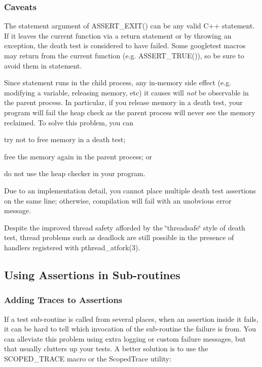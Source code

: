 \subsubsection*{Caveats}

The {\ttfamily statement} argument of {\ttfamily A\+S\+S\+E\+R\+T\+\_\+\+E\+X\+I\+T()} can be any valid C++ statement. If it leaves the current function via a {\ttfamily return} statement or by throwing an exception, the death test is considered to have failed. Some googletest macros may return from the current function (e.\+g. {\ttfamily A\+S\+S\+E\+R\+T\+\_\+\+T\+R\+U\+E()}), so be sure to avoid them in {\ttfamily statement}.

Since {\ttfamily statement} runs in the child process, any in-\/memory side effect (e.\+g. modifying a variable, releasing memory, etc) it causes will {\itshape not} be observable in the parent process. In particular, if you release memory in a death test, your program will fail the heap check as the parent process will never see the memory reclaimed. To solve this problem, you can


\begin{DoxyEnumerate}
\item try not to free memory in a death test;
\item free the memory again in the parent process; or
\item do not use the heap checker in your program.
\end{DoxyEnumerate}

Due to an implementation detail, you cannot place multiple death test assertions on the same line; otherwise, compilation will fail with an unobvious error message.

Despite the improved thread safety afforded by the \char`\"{}threadsafe\char`\"{} style of death test, thread problems such as deadlock are still possible in the presence of handlers registered with {\ttfamily pthread\+\_\+atfork(3)}.

\subsection*{Using Assertions in Sub-\/routines}

\subsubsection*{Adding Traces to Assertions}

If a test sub-\/routine is called from several places, when an assertion inside it fails, it can be hard to tell which invocation of the sub-\/routine the failure is from. You can alleviate this problem using extra logging or custom failure messages, but that usually clutters up your tests. A better solution is to use the {\ttfamily S\+C\+O\+P\+E\+D\+\_\+\+T\+R\+A\+CE} macro or the {\ttfamily Scoped\+Trace} utility\+:


